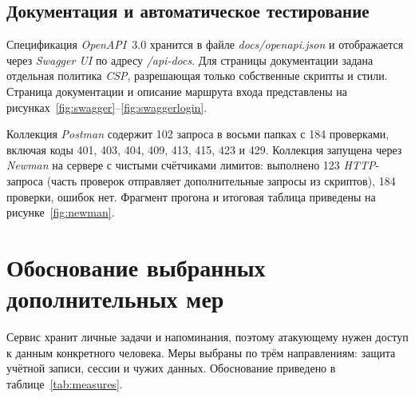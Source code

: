 \documentclass{stp}
\begin{document}

\subsection{Документация и автоматическое тестирование}

Спецификация \textit{OpenAPI}~3.0 хранится в файле \textit{docs/openapi.json} и
отображается через \textit{Swagger UI} по адресу \textit{/api-docs}. Для страницы
документации задана отдельная политика \textit{CSP}, разрешающая только
собственные скрипты и стили. Страница документации и описание маршрута
входа представлены на рисунках~\ref{fig:swagger}--\ref{fig:swaggerlogin}.



Коллекция \textit{Postman} содержит 102 запроса в восьми папках с 184
проверками, включая коды 401, 403, 404, 409, 413, 415, 423 и 429.
Коллекция запущена через \textit{Newman} на сервере с чистыми счётчиками
лимитов: выполнено 123 \textit{HTTP}-запроса (часть проверок отправляет
дополнительные запросы из скриптов), 184 проверки, ошибок нет. Фрагмент
прогона и итоговая таблица приведены на рисунке~\ref{fig:newman}.


\section{Обоснование выбранных дополнительных мер}

Сервис хранит личные задачи и напоминания, поэтому атакующему нужен
доступ к данным конкретного человека. Меры выбраны по трём направлениям:
защита учётной записи, сессии и чужих данных. Обоснование приведено в
таблице~\ref{tab:measures}.
\end{document}
